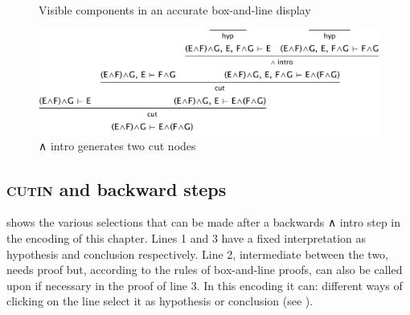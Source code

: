 \begin{figure}
\qquad
{}
\caption{Visible components in an accurate box-and-line display}
\label{fig:I2L:andcutinbox}
\end{figure}

\begin{figure}
\centering
\includegraphics[scale=0.5]{pics/I2L/andcutintree}
\caption{∧ intro generates two cut nodes}
\label{fig:I2L:andcutintree}
\end{figure}

\subsection{\textsc{cutin} and backward steps}

 shows the various selections that can be made after a backwards ∧ intro step in the encoding of this chapter. Lines 1 and 3 have a fixed interpretation as hypothesis and conclusion respectively. Line 2, intermediate between the two, needs proof but, according to the rules of box-and-line proofs, can also be called upon if necessary in the proof of line 3. In this encoding it can: different ways of clicking on the line select it as hypothesis or conclusion (see ). 

